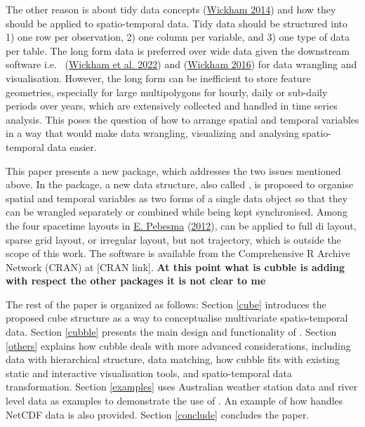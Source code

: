 \documentclass{article}
\begin{document}
The other reason is about tidy data concepts (\protect\hyperlink{ref-tidydata}{Wickham 2014}) and how they should be applied to spatio-temporal data. Tidy data should be structured into 1) one row per observation, 2) one column per variable, and 3) one type of data per table. The long form data is preferred over wide data given the downstream software i.e.~ (\protect\hyperlink{ref-dplyr}{Wickham et al. 2022}) and  (\protect\hyperlink{ref-ggplot2}{Wickham 2016}) for data wrangling and visualisation. However, the long form can be inefficient to store feature geometries, especially for large multipolygons for hourly, daily or sub-daily periods over years, which are extensively collected and handled in time series analysis. This poses the question of how to arrange spatial and temporal variables in a way that would make data wrangling, visualizing and analysing spatio-temporal data easier.

This paper presents a new  package,  which addresses the two issues mentioned above. In the package, a new data structure, also called , is proposed to organise spatial and temporal variables as two forms of a single data object so that they can be wrangled separately or combined while being kept synchronised. Among the four spacetime layouts in \protect\hyperlink{ref-spacetime}{E. Pebesma} (\protect\hyperlink{ref-spacetime}{2012}),  can be applied to full di layout, sparse grid layout, or irregular layout, but not trajectory, which is outside the scope of this work. The software is available from the Comprehensive R Archive Network (CRAN) at {[}CRAN link{]}. \textbf{At this point what is cubble is adding with respect the other packages it is not clear to me}

The rest of the paper is organized as follows: Section \ref{cube} introduces the proposed cube structure as a way to conceptualise multivariate spatio-temporal data. Section \ref{cubble} presents the main design and functionality of . Section \ref{others} explains how cubble deals with more advanced considerations, including data with hierarchical structure, data matching, how cubble fits with existing static and interactive visualisation tools, and spatio-temporal data transformation. Section \ref{examples} uses Australian weather station data and river level data as examples to demonstrate the use of . An example of how  handles NetCDF data is also provided. Section \ref{conclude} concludes the paper.
\end{document}
